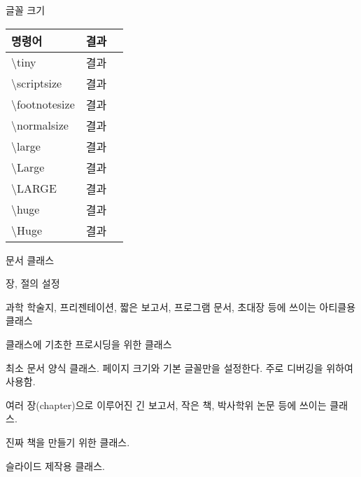 \documentclass[ aspectratio=149,  10pt,blue,xcolor=pdftex,dvipsnames,table,handout,notes]{beamer}
\begin{document}
		\begin{frame}[t,allowframebreaks]{글꼴 크기}

			\begin{table}
			\begin{tabular}{ l l l  }
				명령어		&결과\\
				\hline
				\textbackslash tiny			&\tiny{결과}\\
				\textbackslash scriptsize		&\scriptsize{결과}\\
				\textbackslash footnotesize		&\footnotesize{결과}\\
				\textbackslash normalsize		&\normalsize{결과}\\
				\textbackslash large			&\large{결과}\\
				\textbackslash Large			&\Large{결과}\\
				\textbackslash LARGE			&\LARGE{결과}\\
				\textbackslash huge			&\huge{결과}\\
				\textbackslash Huge			&\Huge{결과}\\
			\end{tabular}
			\end{table}

		\note[item]{}
		\end{frame}











		\begin{frame}[t,shrink=00]{문서 클래스}


			\begin{block} {장, 절의 설정}
			\begin{description}[1234567890]
			\item [article] 과학 학술지, 프리젠테이션, 짧은 보고서, 프로그램 문서, 초대장 등에 쓰이는 아티클용 클래스
			\item [proc article] 클래스에 기초한 프로시딩을 위한 클래스 
			\item [minimal] 최소 문서 양식 클래스. 페이지 크기와 기본 글꼴만을 설정한다. 주로 디버깅을 위하여 사용함.
			\item [report] 여러 장(chapter)으로 이루어진 긴 보고서, 작은 책, 박사학위 논문 등에 쓰이는 클래스.
			\item [book] 진짜 책을 만들기 위한 클래스.
			\item [slides] 슬라이드 제작용 클래스. 
			\end{description}
			\end{block}



		\note[item]{}
		\end{frame}
\end{document}
